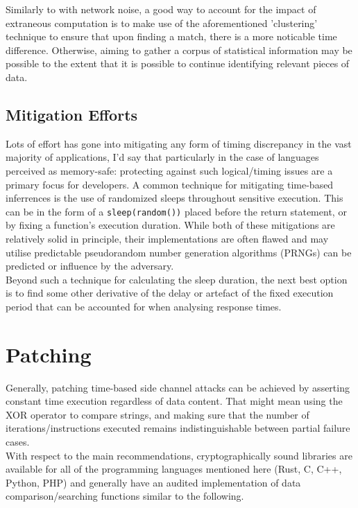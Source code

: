 				Similarly to with network noise, a good way to account for the impact of extraneous computation is to make use of the aforementioned 'clustering' technique
				to ensure that upon finding a match, there is a more noticable time difference. Otherwise, aiming to gather a corpus of statistical information may be possible
				to the extent that it is possible to continue identifying relevant pieces of data.
			
\subsection{Mitigation Efforts}
			
				Lots of effort has gone into mitigating any form of timing discrepancy in the vast majority of applications, I'd say that particularly in the case of
				languages perceived as memory-safe: protecting against such logical/timing issues are a primary focus for developers.
				A common technique for mitigating time-based inferrences is the use of randomized sleeps throughout sensitive execution. This can be in the form of a
				\texttt{sleep(random())} placed before the return statement, or by fixing a function's execution duration.
				While both of these mitigations are relatively solid in principle, their implementations are often flawed and may utilise predictable pseudorandom number
				generation algorithms (PRNGs) can be predicted or influence by the adversary.\\

				Beyond such a technique for calculating the sleep duration, the next best option is to find some other derivative of the delay or artefact of
				the fixed execution period that can be accounted for when analysing response times.
			
		
\section{Patching}
		
			Generally, patching time-based side channel attacks can be achieved by asserting constant time execution regardless of data content. That might mean
			using the XOR operator to compare strings, and making sure that the number of iterations/instructions executed remains indistinguishable between
			partial failure cases.\\

			With respect to the main recommendations, cryptographically sound libraries are available for all of the programming languages mentioned here (Rust, C, C++, Python, PHP)
			and generally have an audited implementation of data comparison/searching functions similar to the following.
		
